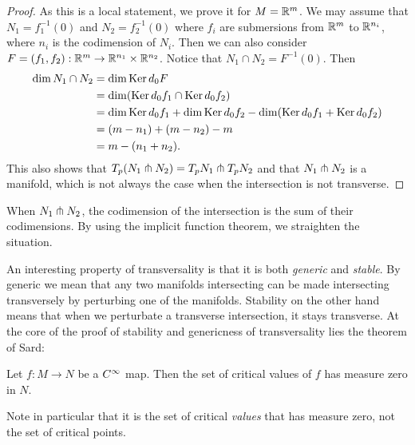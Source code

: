 \begin{proof}
    As this is a local statement, we prove it for $M = \mathbb{R}^{m}$.
    We may assume that $N_1 = f_1^{-1}(0)$ and $ N_2 = f_2^{-1}(0)$ where $f_i$ are submersions from $\mathbb{R}^{m}$ to $\mathbb{R}^{n_i}$, where $n_i$ is the codimension of $N_i$.
    Then we can also consider $F= (f_1, f_2): \mathbb{R}^{m} \to  \mathbb{R}^{n_1} \times \mathbb{R}^{n_2}$.
    Notice that $ N_1 \cap N_2 = F^{-1}(0)$.
    Then
    \begin{align*}
        \dim N_1 \cap  N_2 &= \dim \operatorname{Ker} d_0F\\
                           &= \dim(\operatorname{Ker} d_0 f_1 \cap \operatorname{Ker} d_0 f_2)\\
                           &= \dim \operatorname{Ker} d_0 f_1 + \dim \operatorname{Ker} d_0 f_2 - \dim (\operatorname{Ker} d_0 f_1 + \operatorname{Ker} d_0 f_2)\\
                           &= (m - n_1) + (m - n_2) - m\\
                           &= m - (n_1 + n_2)
    .\end{align*} 
    This also shows that $T_p(N_1 \pitchfork N_2) = T_pN_1 \pitchfork T_pN_2$ and that $ N_1 \pitchfork N_2$ is a manifold, which is not always the case when the intersection is not transverse.
\end{proof}
\begin{marginfigure}[-5cm]
    \centering
    \caption{When $N_1 \pitchfork N_2$, the codimension of the intersection is the sum of their codimensions. By using the implicit function theorem, we straighten the situation.}
    \label{fig:codimensions-transverse}
\end{marginfigure}

An interesting property of transversality is that it is both \emph{generic} and \emph{stable}.
By generic we mean that any two manifolds intersecting can be made intersecting transversely by perturbing one of the manifolds.
Stability on the other hand means that when we perturbate a transverse intersection, it stays transverse.
At the core of the proof of stability and genericness of transversality lies the theorem of Sard:
\begin{theorem}
    Let $f: M \to  N$ be a $C^\infty$ map. Then the set of critical values of  $f$ has measure zero in $N$.
\end{theorem}
Note in particular that it is the set of critical \emph{values} that has measure zero, not the set of critical points. 

